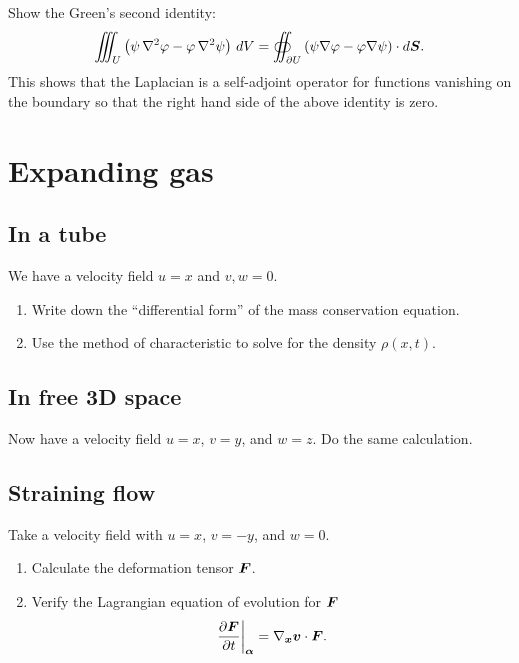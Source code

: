 \documentclass[11pt,letterpaper]{report}
\begin{document}
\subsection{}
Show the Green's second identity:
\begin{align}
    \iiint_U \left( \psi \, \nabla^2 \varphi - \varphi \, \nabla^2 \psi\right)\, dV = \oiint_{\partial U} \left( \psi \nabla \varphi - \varphi \nabla \psi\right)\cdot d\boldsymbol{S}.
\end{align}
This shows that the Laplacian is a self-adjoint operator for functions vanishing on the boundary so that the right hand side of the above identity is zero.


\section{Expanding gas}
\subsection{In a tube}
We have a velocity field $u=x$ and $v,w=0$. 
\begin{enumerate}
    \item Write down the ``differential form'' of the mass conservation equation.
    \item Use the method of characteristic to solve for the density $\rho(x,t)$.
\end{enumerate}

\subsection{In free 3D space}
Now have a velocity field $u=x$, $v=y$, and $w=z$. Do the same calculation.

\subsection{Straining flow}
Take a velocity field with $u=x$, $v=-y$, and $w=0$. 
\begin{enumerate}
    \item Calculate the deformation tensor $\boldsymbol{F}$.
    \item Verify the Lagrangian equation of evolution for $\boldsymbol{F}$
        \begin{align}
            \left.\frac{\partial\boldsymbol{F}}{\partial t}\right|_{\boldsymbol{\alpha}} = \nabla_{\boldsymbol{x}}\boldsymbol{v}\cdot \boldsymbol{F}.
        \end{align}
\end{enumerate}
\end{document}
